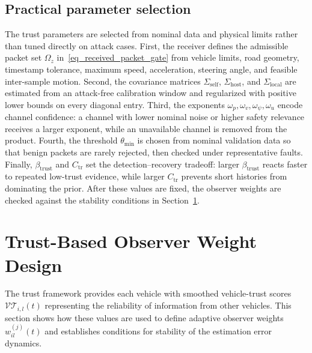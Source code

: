 \documentclass[letterpaper,journal]{IEEEtran}
\def\VT{\mathcal{VT}} %
\def\O{\mathcal{O}} %
\begin{document}
\subsection{Practical parameter selection}\label{subsec_trust_tuning}
The trust parameters are selected from nominal data and physical limits rather than tuned directly on attack cases. First, the receiver defines the admissible packet set $\Omega_z$ in~\eqref{eq_received_packet_gate} from vehicle limits, road geometry, timestamp tolerance, maximum speed, acceleration, steering angle, and feasible inter-sample motion. Second, the covariance matrices $\Sigma_{\text{self}}$, $\Sigma_{\text{host}}$, and $\Sigma_{\text{local}}$ are estimated from an attack-free calibration window and regularized with positive lower bounds on every diagonal entry. Third, the exponents $\omega_p,\omega_v,\omega_\psi,\omega_u$ encode channel confidence: a channel with lower nominal noise or higher safety relevance receives a larger exponent, while an unavailable channel is removed from the product. Fourth, the threshold $\theta_{\min}$ is chosen from nominal validation data so that benign packets are rarely rejected, then checked under representative faults. Finally, $\beta_{\text{trust}}$ and $C_{\mathrm{tr}}$ set the detection--recovery tradeoff: larger $\beta_{\text{trust}}$ reacts faster to repeated low-trust evidence, while larger $C_{\mathrm{tr}}$ prevents short histories from dominating the prior. After these values are fixed, the observer weights are checked against the stability conditions in Section~\ref{sec_weight_design}.



\section{Trust-Based Observer Weight Design}\label{sec_weight_design}
The trust framework provides each vehicle with smoothed vehicle-trust scores $\VT_{i,l}(t)$ representing the reliability of information from other vehicles.
This section shows how these values are used to define adaptive observer weights $w_{il}^{(j)}(t)$ and establishes conditions for stability of the estimation error dynamics.
\end{document}
